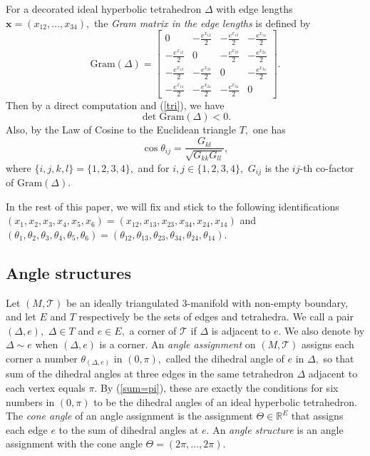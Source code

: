 \documentclass[11pt]{article}
\theoremstyle{remark}
\theoremstyle{remark}
\numberwithin{equation}{section}
\begin{document}
For a decorated ideal hyperbolic tetrahedron $\Delta$ with edge lengths $\boldsymbol x= (x_{12},\dots,x_{34}),$  the  \emph{Gram matrix in the edge lengths} is defined by
\begin{equation*}
\mathrm{Gram}(\Delta)=\begin{bmatrix}
0 & -\frac{e^{x_{12}}}{2} & -\frac{e^{x_{13}}}{2}
    & -\frac{e^{x_{14}}}{2} \\
-\frac{e^{x_{12}}}{2} & 0 &-\frac{e^{x_{23}}}{2}
    & -\frac{e^{x_{24}}}{2}\\
   -\frac{e^{x_{13}}}{2} & -\frac{e^{x_{23}}}{2} & 0
    & -\frac{e^{x_{34}}}{2} \\
-\frac{e^{x_{14}}}{2} & -\frac{e^{x_{24}}}{2} &-\frac{e^{x_{34}}}{2}
    & 0
  \end{bmatrix}.
\end{equation*}
Then by a direct computation and (\ref{tri}), we have 
\begin{equation}\label{det-}
   \det\mathrm{Gram}(\Delta)<0.
\end{equation}
Also,  by the Law of Cosine to the Euclidean triangle $T,$
one has
\begin{equation}\label{cos}
    \cos\theta_{ij}=\frac{G_{kl}}{\sqrt{G_{kk}G_{ll}}},
\end{equation}
where $\{i,j,k,l\}=\{1,2,3,4\},$ and for $i,j\in\{1,2,3,4\},$ $G_{ij}$ is the $ij$-th co-factor of $\mathrm{Gram}(\Delta).$

\bigskip


 In the rest of this paper, we will fix and stick to the following identifications $(x_1,x_2,x_3,x_4,x_5,x_6)=(x_{12},x_{13},x_{23},x_{34},x_{24},x_{14})$  and 
$(\theta_1,\theta_2,\theta_3,\theta_4,\theta_5,\theta_6)=(\theta_{12},\theta_{13},\theta_{23},\theta_{34},\theta_{24},\theta_{14}).$ 


\subsection{Angle structures}\label{AS}

Let $(M,\mathcal{T})$ be an ideally triangulated 3-manifold with non-empty boundary, and let 
$E$ and $T$ respectively be the sets of edges and tetrahedra. We call a pair $(\Delta,e),$ $\Delta\in T$ and $e\in E,$  a corner of $\mathcal T$ if $\Delta$ is adjacent to  $e.$ We also denote by $\Delta\sim e$ when $(\Delta,e)$ is a corner. An \emph{angle assignment} on $(M, \mathcal T)$ assigns each corner a number $\theta_{(\Delta,e)}$ in $(0,\pi),$  called
the dihedral angle of $e$ in $\Delta,$ so that sum of
the dihedral angles at three edges in the same tetrahedron
$\Delta$ adjacent to each vertex equals $\pi.$ By (\ref{sum=pi}), these are exactly the conditions for six numbers in $(0,\pi)$ to be the dihedral angles of an ideal hyperbolic tetrahedron. 
 The {\it cone angle} of
an angle assignment is the assignment  $ \Theta \in \mathbb R^E$ that assigns  each edge $e$ to the sum of
dihedral angles at $e.$ An \emph{angle structure} is an  angle assignment with the cone angle $\Theta=(2\pi,\dots,2\pi).$
\end{document}
